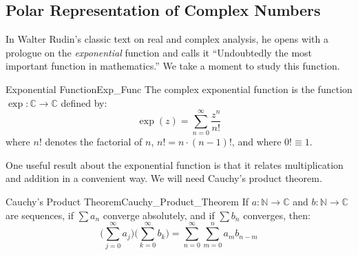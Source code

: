 \subsection{Polar Representation of Complex Numbers}
    In Walter Rudin's classic text on real and
    complex analysis, he opens with a prologue on the
    \textit{exponential} function and calls it
    ``Undoubtedly the most important function in
    mathematics.'' We take a moment to study this function.
    \begin{ldefinition}{Exponential Function}{Exp_Func}
        The complex exponential function is the function
        $\exp:\mathbb{C}\rightarrow\mathbb{C}$ defined by:
        \begin{equation}
            \exp(z)=\sum_{n=0}^{\infty}\frac{z^{n}}{n!}
        \end{equation}
        where $n!$ denotes the factorial of $n$,
        $n!=n\cdot(n-1)!$, and where $0!\equiv{1}$.
    \end{ldefinition}
    One useful result about the exponential function is that it relates
    multiplication and addition in a convenient way. We will need
    Cauchy's product theorem.
    \begin{ltheorem}{Cauchy's Product Theorem}{Cauchy_Product_Theorem}
        If $a:\mathbb{N}\rightarrow\mathbb{C}$ and
        $b:\mathbb{N}\rightarrow\mathbb{C}$ are sequences, if
        $\sum{a}_{n}$ converge absolutely, and if $\sum{b}_{n}$
        converges, then:
        \begin{equation}
            \Big(\sum_{j=0}^{\infty}a_{j}\Big)
            \Big(\sum_{k=0}^{\infty}b_{k}\Big)
                =\sum_{n=0}^{\infty}\sum_{m=0}^{n}a_{m}b_{n-m}
        \end{equation}
    \end{ltheorem}
